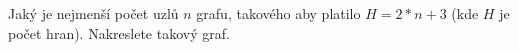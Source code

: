 Jaký je nejmenší počet uzlů $n$ grafu, takového aby platilo $H=2*n+3$ (kde $H$
je počet hran). Nakreslete takový graf.

